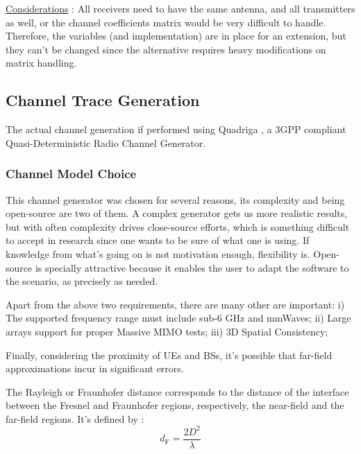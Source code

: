 


\ul{Considerations} \hspace{-0.3cm}:
All receivers need to have the same antenna, and all transmitters as well, or the channel coefficients matrix would be very difficult to handle. Therefore, the variables (and implementation) are in place for an extension, but they can't be changed since the alternative requires heavy modifications on matrix handling.




\subsection{Channel Trace Generation} 
\label{subsec:channel_gen}
The actual channel generation if performed using Quadriga \cite{Quadriga}, a 3GPP compliant Quasi-Deterministic Radio Channel Generator.

\subsubsection*{Channel Model Choice}
This channel generator was chosen for several reasons, its complexity and being open-source are two of them. A complex generator gets us more realistic results, but with often complexity drives close-source efforts, which is something difficult to accept in research since one wants to be sure of what one is using. If knowledge from what's going on  is not motivation enough, flexibility is. Open-source is specially attractive because it enables the user to adapt the software to the scenario, as precisely as needed.

Apart from the above two requirements, there are many other are important: i) The supported frequency range must include sub-6 GHz and mmWaves; ii) Large arrays support for proper Massive \acs{MIMO} tests; iii) 3D Spatial Consistency;

Finally, considering the proximity of \acsp{UE} and \acsp{BS}, it's possible that far-field approximations incur in significant errors. 

The Rayleigh or Fraunhofer distance corresponds to the distance of the interface between the Fresnel and Fraunhofer regions, respectively, the near-field and the far-field regions. It's defined by \label{fraun}:
\begin{equation} \label{fraun}
    d_\text{F} = \frac{2 D^2}{\lambda}
\end{equation} 

